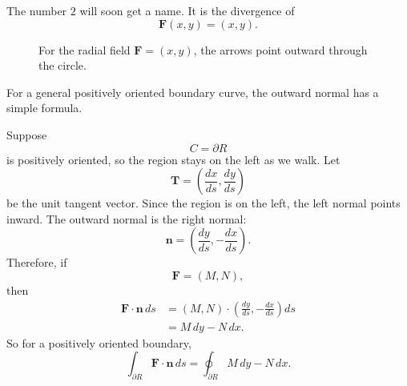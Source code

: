 The number \(2\) will soon get a name.  It is the divergence of
\[
    \mathbf F(x,y)=(x,y).
\]

\begin{figure}[h]
\centering
{}
\caption{For the radial field \(\mathbf F=(x,y)\), the arrows point outward through the
circle.}
\end{figure}

For a general positively oriented boundary curve, the outward normal has a simple
formula.

Suppose
\[
    C=\partial R
\]
is positively oriented, so the region stays on the left as we walk.  Let
\[
    \mathbf T=\left(\frac{dx}{ds},\frac{dy}{ds}\right)
\]
be the unit tangent vector.  Since the region is on the left, the left normal points
inward.  The outward normal is the right normal:
\[
\boxed{
    \mathbf n=
    \left(
        \frac{dy}{ds},
        -\frac{dx}{ds}
    \right).
}
\]
Therefore, if
\[
    \mathbf F=(M,N),
\]
then
\[
\begin{aligned}
    \mathbf F\cdot\mathbf n\,ds
    &=
    (M,N)\cdot
    \left(
        \frac{dy}{ds},
        -\frac{dx}{ds}
    \right)ds\\
    &=
    M\,dy-N\,dx.
\end{aligned}
\]
So for a positively oriented boundary,
\[
\boxed{
    \int_{\partial R}\mathbf F\cdot\mathbf n\,ds
    =
    \oint_{\partial R} M\,dy-N\,dx.
}
\]

